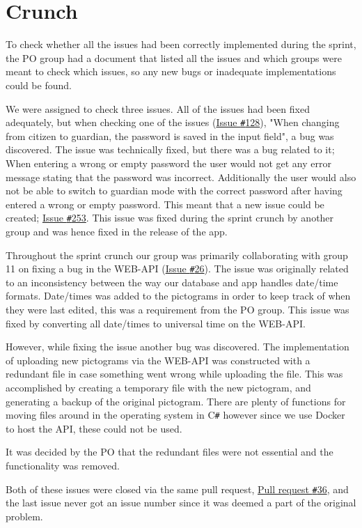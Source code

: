 \section{Crunch}
To check whether all the issues had been correctly implemented during the sprint, the PO group had a document that listed all the issues and which groups were meant to check which issues, so any new bugs or inadequate implementations could be found.

We were assigned to check three issues.
All of the issues had been fixed adequately, but when checking one of the issues (\href{https://github.com/aau-giraf/weekplanner/issues/128}{Issue \texttt{\#}128}), "When changing from citizen to guardian, the password is saved in the input field", a bug was discovered.
The issue was technically fixed, but there was a bug related to it; When entering a wrong or empty password the user would not get any error message stating that the password was incorrect.
Additionally the user would also not be able to switch to guardian mode with the correct password after having entered a wrong or empty password.
This meant that a new issue could be created; \href{https://github.com/aau-giraf/weekplanner/issues/253}{Issue \texttt{\#}253}.
This issue was fixed during the sprint crunch by another group and was hence fixed in the release of the app.

Throughout the sprint crunch our group was primarily collaborating with group 11 on fixing a bug in the WEB-API (\href{https://github.com/aau-giraf/web-api/issues/26}{Issue \texttt{\#}26}).
The issue was originally related to an inconsistency between the way our database and app handles date/time formats. 
Date/times was added to the pictograms in order to keep track of when they were last edited, this was a requirement from the PO group. 
This issue was fixed by converting all date/times to universal time on the WEB-API. 

However, while fixing the issue another bug was discovered.
The implementation of uploading new pictograms via the WEB-API was constructed with a redundant file in case something went wrong while uploading the file. 
This was accomplished by creating a temporary file with the new pictogram, and generating a backup of the original pictogram. 
There are plenty of functions for moving files around in the operating system in C\texttt{\#} however since we use Docker to host the API, these could not be used. 

It was decided by the PO that the redundant files were not essential and the functionality was removed.

Both of these issues were closed via the same pull request, \href{https://github.com/aau-giraf/web-api/pull/36}{Pull request \texttt{\#}36}, and the last issue never got an issue number since it was deemed a part of the original problem. 
